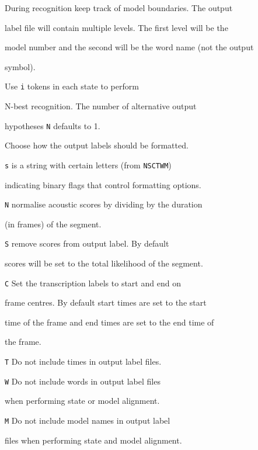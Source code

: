 \begin{optlist}
   During recognition keep track of model boundaries. The output


        label file will contain multiple levels. The first level will be the 


        model number and the second will be the word name (not the output 


        symbol).








   Use \texttt{i} tokens in each state to perform


        N-best recognition.  The number of alternative output


        hypotheses \texttt{N} defaults to 1.





   Choose how the output labels should be formatted.


        \texttt{s} is a string with certain letters (from \texttt{NSCTWM})


        indicating binary flags that control formatting options.


        \texttt{N} normalise acoustic scores by dividing by the duration


        (in frames) of the segment.


        \texttt{S} remove scores from output label.  By default 


        scores will be set to the total likelihood of the segment.


        \texttt{C} Set the transcription labels to start and end on


        frame centres. By default start times are set to the start


        time of the frame and end times are set to the end time of 


        the frame.


        \texttt{T} Do not include times in output label files.


        \texttt{W} Do not include words in output label files


        when performing state or model alignment.


        \texttt{M} Do not include model names in output label


        files when performing state and model alignment.






\end{optlist}
